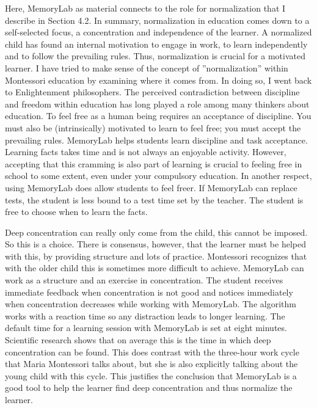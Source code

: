 \documentclass[12pt, a4paper]{article}
\begin{document}
Here, MemoryLab as material connects to the role for normalization that I describe in Section 4.2. In summary, normalization in education comes down to a self-selected focus, a concentration and independence of the learner. A normalized child has found an internal motivation to engage in work, to learn independently and to follow the prevailing rules. Thus, normalization is crucial for a motivated learner. I have tried to make sense of the concept of ''normalization'' within Montessori education by examining where it comes from. In doing so, I went back to Enlightenment philosophers. The perceived contradiction between discipline and freedom within education has long played a role among many thinkers about education. To feel free as a human being requires an acceptance of discipline. You must also be (intrinsically) motivated to learn to feel free; you must accept the prevailing rules. MemoryLab helps students learn discipline and task acceptance. Learning facts takes time and is not always an enjoyable activity. However, accepting that this cramming is also part of learning is crucial to feeling free in school to some extent, even under your compulsory education. In another respect, using MemoryLab does allow students to feel freer. If MemoryLab can replace tests, the student is less bound to a test time set by the teacher. The student is free to choose when to learn the facts.

Deep concentration can really only come from the child, this cannot be imposed. So this is a choice. There is consensus, however, that the learner must be helped with this, by providing structure and lots of practice. Montessori recognizes that with the older child this is sometimes more difficult to achieve. MemoryLab can work as a structure and an exercise in concentration. The student receives immediate feedback when concentration is not good and notices immediately when concentration decreases while working with MemoryLab. The algorithm works with a reaction time so any distraction leads to longer learning. The default time for a learning session with MemoryLab is set at eight minutes. Scientific research shows that on average this is the time in which deep concentration can be found. This does contrast with the three-hour work cycle that Maria Montessori talks about, but she is also explicitly talking about the young child with this cycle. This justifies the conclusion that MemoryLab is a good tool to help the learner find deep concentration and thus normalize the learner.
\end{document}
